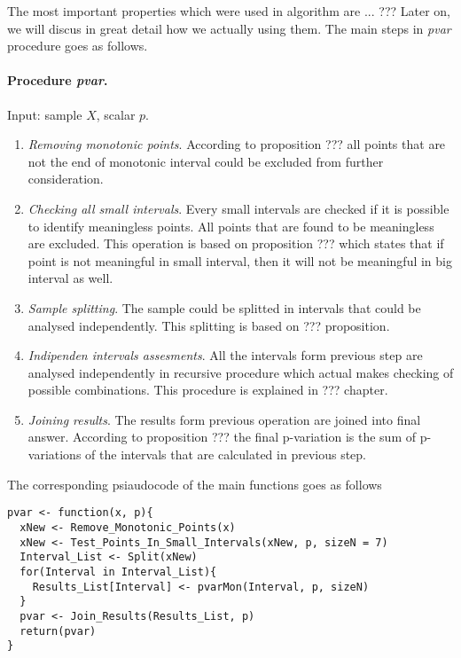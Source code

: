 \documentclass[12pt, a4paper]{article}
\numberwithin{equation}{section}
\begin{document}
The most important properties which were used in algorithm are
 ... ??? 
Later on, we will
discus in great detail how we actually using them.
The main steps in \emph{pvar} procedure
goes as follows.


\paragraph{Procedure \emph{pvar}.}
Input: sample $X$, scalar $p$.

\begin{enumerate}
  \item \emph{Removing monotonic points}. According to proposition ???
  all points that are not the end of monotonic interval could be excluded 
  from further consideration. 
  
  \item \emph{Checking all small intervals}. Every small intervals are
    checked if it is possible to identify meaningless points. All points
    that are found to be meaningless are excluded. 
    This operation is based on proposition ??? which states that 
    if point is not meaningful in small interval, then it will not be
    meaningful in big interval as well.
 
  \item \emph{Sample splitting}. The sample could be splitted  in 
   intervals that could be analysed independently. 
   This splitting is based on ??? proposition.
  
  \item \emph{Indipenden intervals assesments}. All the intervals form
   previous step are analysed independently in recursive procedure which
   actual makes checking of possible combinations. 
   This procedure is explained in ??? chapter. 
  
  \item \emph{Joining results}. The results form previous operation 
  are joined into final answer. 
  According to proposition ??? the final p-variation is 
  the sum of p-variations of the intervals 
  that are calculated in previous step.
  
\end{enumerate}

The corresponding psiaudocode of the main functions goes as follows
\begin{lstlisting}
pvar <- function(x, p){
  xNew <- Remove_Monotonic_Points(x) 
  xNew <- Test_Points_In_Small_Intervals(xNew, p, sizeN = 7) 
  Interval_List <- Split(xNew)
  for(Interval in Interval_List){
    Results_List[Interval] <- pvarMon(Interval, p, sizeN)
  }
  pvar <- Join_Results(Results_List, p)  
  return(pvar)
}
\end{lstlisting}
  
\end{document}
